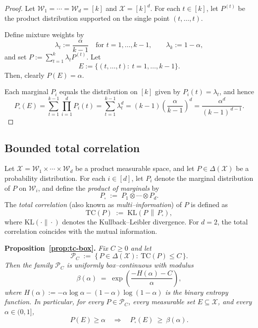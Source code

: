 \documentclass[arxiv]{colt2026}
\newenvironment{restatedproposition}[1]
  {\par\noindent\textbf{Proposition~\ref{#1}.}\itshape}
  {\par}
\newcommand{\X}{\mathcal{X}}
\newcommand{\W}{\mathcal{W}}
\newcommand{\Pc}{\mathcal{P}}
\newcommand{\KL}{\mathrm{KL}}
\begin{document}
\begin{proof}
Let $\W_1=\cdots=\W_d=[k]$ and $\X=[k]^d$.
For each $t\in[k]$, let $P^{(t)}$ be the product distribution supported on the
single point $(t,\ldots,t)$.

Define mixture weights by
\[
\lambda_t:=\frac{\alpha}{k-1}\quad\text{for }t=1,\ldots,k-1,
\qquad
\lambda_k:=1-\alpha,
\]
and set $P:=\sum_{t=1}^k \lambda_t P^{(t)}$.
Let
\[
E:=\{(t,\ldots,t):\ t=1,\ldots,k-1\}.
\]
Then, clearly $P(E)=\alpha$.

Each marginal $P_i$ equals the distribution on $[k]$ given by $P_i(t)=\lambda_t$,
and hence
\[
P_{\square}(E)
=
\sum_{t=1}^{k-1} \prod_{i=1}^d P_i(t)
=
\sum_{t=1}^{k-1} \lambda_t^d
=
(k-1)\left(\frac{\alpha}{k-1}\right)^d
=
\frac{\alpha^d}{(k-1)^{\,d-1}}.
\]
\end{proof}
% 
\subsection{Bounded total correlation}\label{sec:proof-bounded-info}

\begin{definition}
\label{def:total-correlation}
Let $\X=\W_1\times\cdots\times \W_d$ be a product measurable space, and let
$P\in\Delta(\X)$ be a probability distribution.
For each $i\in[d]$, let $P_i$ denote the marginal distribution of $P$ on $\W_i$,
and define the \emph{product of marginals} by
\[
P_{\square}
\;:=\;
P_1\otimes\cdots\otimes P_d .
\]
The \emph{total correlation} (also known as \emph{multi--information}) of $P$ is
defined as
\[
\mathrm{TC}(P)
\;:=\;
\KL\!\left(P\,\middle\|\,P_{\square}\right),
\]
where $\KL(\cdot\|\cdot)$ denotes the Kullback--Leibler divergence.
For $d=2$, the total correlation coincides with the mutual information.
\end{definition}

\begin{restatedproposition}{prop:tc-box}
Fix $C\ge 0$ and let
\[
\Pc_C \;:=\; \{\,P\in\Delta(\X):\ \mathrm{TC}(P)\le C\,\}.
\]
Then the family $\Pc_C$ is uniformly box--continuous with modulus
\[
\beta(\alpha)
\;=\;
\exp\!\left(\frac{-H(\alpha)-C}{\alpha}\right),
\]
where $H(\alpha):=-\alpha\log\alpha-(1-\alpha)\log(1-\alpha)$ is the binary
entropy function.
In particular, for every $P\in\Pc_C$, every measurable set $E\subseteq\X$, and
every $\alpha\in(0,1]$,
\[
P(E)\ge \alpha
\quad\Longrightarrow\quad
P_{\square}(E)\ \ge\ \beta(\alpha).
\]
\end{restatedproposition}
\end{document}
